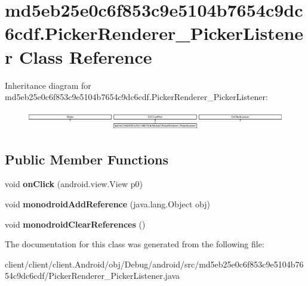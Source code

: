 \hypertarget{classmd5eb25e0c6f853c9e5104b7654c9dc6cdf_1_1PickerRenderer__PickerListener}{}\section{md5eb25e0c6f853c9e5104b7654c9dc6cdf.\+Picker\+Renderer\+\_\+\+Picker\+Listener Class Reference}
\label{classmd5eb25e0c6f853c9e5104b7654c9dc6cdf_1_1PickerRenderer__PickerListener}
Inheritance diagram for md5eb25e0c6f853c9e5104b7654c9dc6cdf.\+Picker\+Renderer\+\_\+\+Picker\+Listener\+:\begin{figure}[H]
\begin{center}
\leavevmode
\includegraphics[height=0.844646cm]{classmd5eb25e0c6f853c9e5104b7654c9dc6cdf_1_1PickerRenderer__PickerListener}
\end{center}
\end{figure}
\subsection*{Public Member Functions}
\begin{DoxyCompactItemize}
\item 
\hypertarget{classmd5eb25e0c6f853c9e5104b7654c9dc6cdf_1_1PickerRenderer__PickerListener_a7ca509b48fc7076bb93a2fb87b734694}{}void {\bfseries on\+Click} (android.\+view.\+View p0)\label{classmd5eb25e0c6f853c9e5104b7654c9dc6cdf_1_1PickerRenderer__PickerListener_a7ca509b48fc7076bb93a2fb87b734694}

\item 
\hypertarget{classmd5eb25e0c6f853c9e5104b7654c9dc6cdf_1_1PickerRenderer__PickerListener_ac7ae2ddf409a9647a9fb01605c9cae32}{}void {\bfseries monodroid\+Add\+Reference} (java.\+lang.\+Object obj)\label{classmd5eb25e0c6f853c9e5104b7654c9dc6cdf_1_1PickerRenderer__PickerListener_ac7ae2ddf409a9647a9fb01605c9cae32}

\item 
\hypertarget{classmd5eb25e0c6f853c9e5104b7654c9dc6cdf_1_1PickerRenderer__PickerListener_ac11d9b1063a9154c50caa3e5f2d38fa9}{}void {\bfseries monodroid\+Clear\+References} ()\label{classmd5eb25e0c6f853c9e5104b7654c9dc6cdf_1_1PickerRenderer__PickerListener_ac11d9b1063a9154c50caa3e5f2d38fa9}

\end{DoxyCompactItemize}


The documentation for this class was generated from the following file\+:\begin{DoxyCompactItemize}
\item 
client/client/client.\+Android/obj/\+Debug/android/src/md5eb25e0c6f853c9e5104b7654c9dc6cdf/Picker\+Renderer\+\_\+\+Picker\+Listener.\+java\end{DoxyCompactItemize}
